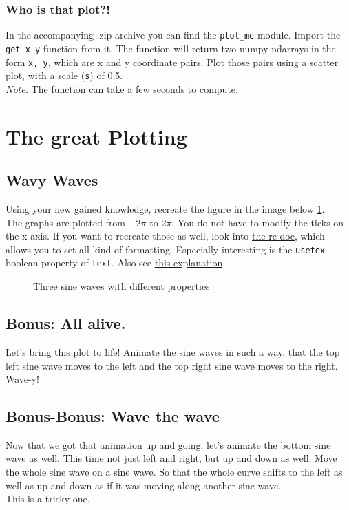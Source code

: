 \subsubsection{Who is that plot?!}
In the accompanying .zip archive you can find the \verb|plot_me| module. 
Import the \verb|get_x_y| function from it. The function will return two
numpy ndarrays in the form \verb|x, y|, which are x and y coordinate pairs.
Plot those pairs using a scatter plot, with a scale (\verb|s|) of 0.5.\\
\emph{Note:} The function can take a few seconds to compute.


\section{The great Plotting}
\subsection{Wavy Waves}
Using your new gained knowledge, recreate the figure in the image  
below \ref{fig:sines}.\\
The graphs are plotted from $-2\pi$ to $2\pi$. You do not have to modify
the ticks on the x-axis. If you want to recreate those as well, look into
\href{https://matplotlib.org/api/_as_gen/matplotlib.pyplot.rc.html}{the rc doc},
which allows you to set all kind of formatting. Especially interesting is the 
\texttt{usetex} boolean property of \texttt{text}. Also see
\href{https://matplotlib.org/users/usetex.html}{this explanation}.

\begin{figure}[h!]
	\caption{Three sine waves with different properties}
	\label{fig:sines}
\end{figure}

\subsection{Bonus: All alive.}
Let's bring this plot to life! Animate the sine waves in such a way, that
the top left sine wave moves to the left and the top right sine wave moves
to the right. Wave-y!
\subsection{Bonus-Bonus: Wave the wave}
Now that we got that animation up and going, let's animate the bottom sine
wave as well. This time not just left and right, but up and down as well.
Move the whole sine wave on a sine wave. So that the whole curve shifts to
the left as well as up and down as if it was moving along another sine wave.\\
This is a tricky one.



